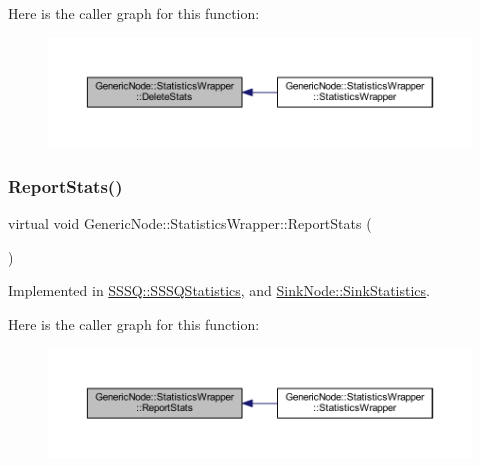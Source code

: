 Here is the caller graph for this function\+:\nopagebreak
\begin{figure}[H]
\begin{center}
\leavevmode
\includegraphics[width=350pt]{class_generic_node_1_1_statistics_wrapper_a08f3642bccd77ccf4d7a8b7010559e1c_icgraph}
\end{center}
\end{figure}
\mbox{\label{class_generic_node_1_1_statistics_wrapper_a280ae59c2d5f64be5848335dc1b77c21}} 
\subsubsection{\texorpdfstring{Report\+Stats()}{ReportStats()}}
{\footnotesize\ttfamily virtual void Generic\+Node\+::\+Statistics\+Wrapper\+::\+Report\+Stats (\begin{DoxyParamCaption}{ }\end{DoxyParamCaption})\hspace{0.3cm}{\ttfamily [pure virtual]}}



Implemented in \hyperlink{class_s_s_s_q_1_1_s_s_s_q_statistics_ab53eda9d3355dec31021cbdba9333c85}{S\+S\+S\+Q\+::\+S\+S\+S\+Q\+Statistics}, and \hyperlink{class_sink_node_1_1_sink_statistics_a2b8337521bc63a06000571aaede60ad9}{Sink\+Node\+::\+Sink\+Statistics}.

Here is the caller graph for this function\+:\nopagebreak
\begin{figure}[H]
\begin{center}
\leavevmode
\includegraphics[width=350pt]{class_generic_node_1_1_statistics_wrapper_a280ae59c2d5f64be5848335dc1b77c21_icgraph}
\end{center}
\end{figure}


